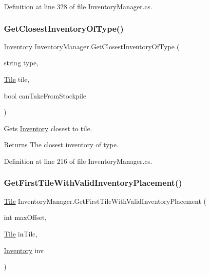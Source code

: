 Definition at line 328 of file Inventory\+Manager.\+cs.

\mbox{\label{class_inventory_manager_a52c2a902e6f16c262df4e046ddd74755}} 
\subsubsection{\texorpdfstring{Get\+Closest\+Inventory\+Of\+Type()}{GetClosestInventoryOfType()}}
{\footnotesize\ttfamily \hyperlink{class_inventory}{Inventory} Inventory\+Manager.\+Get\+Closest\+Inventory\+Of\+Type (\begin{DoxyParamCaption}\item[{string}]{type,  }\item[{\hyperlink{class_tile}{Tile}}]{tile,  }\item[{bool}]{can\+Take\+From\+Stockpile }\end{DoxyParamCaption})}



Gets \hyperlink{class_inventory}{Inventory} closest to tile. 

\begin{DoxyReturn}{Returns}
The closest inventory of type.
\end{DoxyReturn}


Definition at line 216 of file Inventory\+Manager.\+cs.

\mbox{\label{class_inventory_manager_a6d34cf9b8bc2a3b072bb25fe38cce5c4}} 
\subsubsection{\texorpdfstring{Get\+First\+Tile\+With\+Valid\+Inventory\+Placement()}{GetFirstTileWithValidInventoryPlacement()}}
{\footnotesize\ttfamily \hyperlink{class_tile}{Tile} Inventory\+Manager.\+Get\+First\+Tile\+With\+Valid\+Inventory\+Placement (\begin{DoxyParamCaption}\item[{int}]{max\+Offset,  }\item[{\hyperlink{class_tile}{Tile}}]{in\+Tile,  }\item[{\hyperlink{class_inventory}{Inventory}}]{inv }\end{DoxyParamCaption})}



